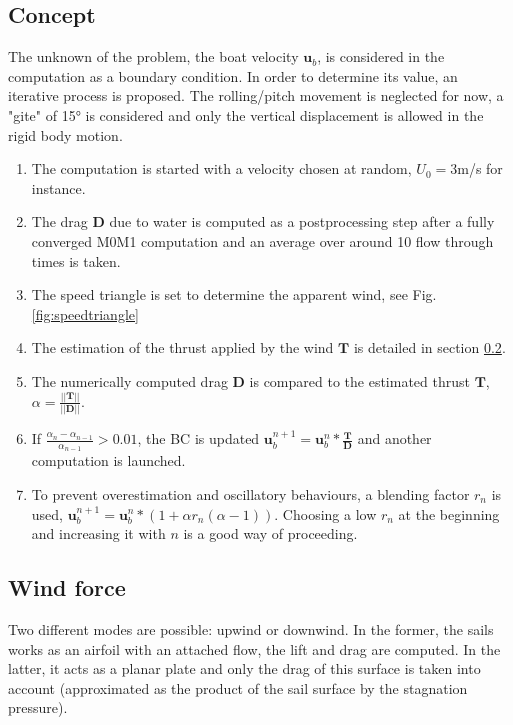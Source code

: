 \subsection{Concept}
    \label{section:iterative_process}
    The unknown of the problem, the boat velocity $\mathbf{u}_b$, is considered in the computation as a boundary condition. In order to determine its value, an iterative process is proposed. 
    The rolling/pitch movement is neglected for now, a "gite" of 15° is considered and only the vertical displacement is allowed in the rigid body motion. 


    \begin{enumerate}
        \item The computation is started with a velocity chosen at random, $U_0 = 3$m/s for instance. 
        \item The drag $\mathbf{D}$ due to water is computed as a postprocessing step after a fully converged M0M1 computation and an average over around 10 flow through times is taken. 
        \item The speed triangle is set to determine the apparent wind, see Fig. \ref{fig:speedtriangle}
        \item The estimation of the thrust applied by the wind $\mathbf{T}$ is detailed in section \ref{section:wind_force}.
        \item The numerically computed drag $\mathbf{D}$ is compared to the estimated thrust $\mathbf{T}$, $\alpha=\frac{||\mathbf{T}||}{||\mathbf{D}||}$.
        \item If $\frac{\alpha_n-\alpha_{n-1}}{\alpha_{n-1}} > 0.01$, the BC is updated $\mathbf{u}_b^{n+1}=\mathbf{u}_b^{n}*\frac{\mathbf{T}}{\mathbf{D}}$ and another computation is launched. 
        \item To prevent overestimation and oscillatory behaviours, a blending factor $r_n$ is used, $\mathbf{u}_b^{n+1}=\mathbf{u}_b^{n}*(1+\alpha r_n(\alpha-1))$. Choosing a low $r_n$ at the beginning and increasing it with $n$ is a good way of proceeding. 
    \end{enumerate}


\subsection{Wind force}
    \label{section:wind_force}
    Two different modes are possible: upwind or downwind. In the former, the sails works as an airfoil with an attached flow, the lift and drag are computed. In the latter, it acts as a planar plate and only the drag of this surface is taken into account (approximated as the product of the sail surface by the stagnation pressure).
    
